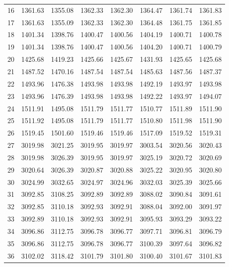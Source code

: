 \documentclass[10pt,oneside]{article}
\begin{document}
\begin{table}[h!]
\begin{tabular}{cccccccc}
16 &   1361.63 & 1355.08 & 1362.33 & 1362.30 &      1364.47 & 1361.74 & 1361.83 \\
17 &   1361.63 & 1355.09 & 1362.33 & 1362.30 &      1364.48 & 1361.75 & 1361.85 \\
18 &   1401.34 & 1398.76 & 1400.47 & 1400.56 &      1404.19 & 1400.71 & 1400.78 \\
19 &   1401.34 & 1398.76 & 1400.47 & 1400.56 &      1404.20 & 1400.71 & 1400.79 \\
20 &   1425.68 & 1419.23 & 1425.66 & 1425.67 &      1431.93 & 1425.65 & 1425.68 \\
21 &   1487.52 & 1470.16 & 1487.54 & 1487.54 &      1485.63 & 1487.56 & 1487.37 \\
22 &   1493.96 & 1476.38 & 1493.98 & 1493.98 &      1492.19 & 1493.97 & 1493.98 \\
23 &   1493.96 & 1476.39 & 1493.98 & 1493.98 &      1492.22 & 1493.97 & 1494.07 \\
24 &   1511.91 & 1495.08 & 1511.79 & 1511.77 &      1510.77 & 1511.89 & 1511.90 \\
25 &   1511.92 & 1495.08 & 1511.79 & 1511.77 &      1510.80 & 1511.98 & 1511.90 \\
26 &   1519.45 & 1501.60 & 1519.46 & 1519.46 &      1517.09 & 1519.52 & 1519.31 \\
27 &   3019.98 & 3021.25 & 3019.95 & 3019.97 &      3003.54 & 3020.56 & 3020.43 \\
28 &   3019.98 & 3026.39 & 3019.95 & 3019.97 &      3025.19 & 3020.72 & 3020.69 \\
29 &   3020.64 & 3026.39 & 3020.87 & 3020.88 &      3025.22 & 3020.95 & 3020.80 \\
30 &   3024.99 & 3032.65 & 3024.97 & 3024.96 &      3032.03 & 3025.39 & 3025.66 \\
31 &   3092.85 & 3108.25 & 3092.89 & 3092.89 &      3088.02 & 3090.84 & 3091.61 \\
32 &   3092.85 & 3110.18 & 3092.93 & 3092.91 &      3088.04 & 3092.00 & 3091.97 \\
33 &   3092.89 & 3110.18 & 3092.93 & 3092.91 &      3095.93 & 3093.29 & 3093.22 \\
34 &   3096.86 & 3112.75 & 3096.78 & 3096.77 &      3097.71 & 3096.81 & 3096.79 \\
35 &   3096.86 & 3112.75 & 3096.78 & 3096.77 &      3100.39 & 3097.64 & 3096.82 \\
36 &   3102.02 & 3118.42 & 3101.79 & 3101.80 &      3100.40 & 3101.67 & 3101.83 \\
\bottomrule
\end{tabular}
\end{table}
\end{document}
